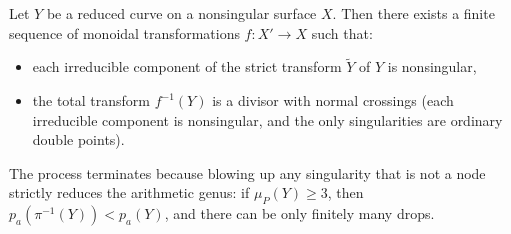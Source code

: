 Let $Y$ be a reduced curve on a nonsingular surface $X$. Then there exists a finite sequence of monoidal transformations $f: X' \to X$ such that:
\begin{itemize}
\item each irreducible component of the strict transform $\tilde{Y}$ of $Y$ is nonsingular,
\item the total transform $f^{-1}(Y)$ is a divisor with normal crossings (each irreducible component is nonsingular, and the only singularities are ordinary double points).
\end{itemize}
The process terminates because blowing up any singularity that is not a node strictly reduces the arithmetic genus: if $\mu_P(Y) \geqslant 3$, then $p_a(\pi^{-1}(Y)) < p_a(Y)$, and there can be only finitely many drops.

